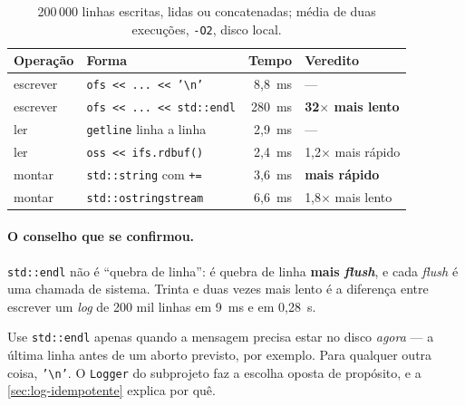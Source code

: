 \begin{table}[htbp]
\centering
\caption{200\,000 linhas escritas, lidas ou concatenadas; média de duas
         execuções, \texttt{-O2}, disco local.}
\label{tab:io-bench}
\footnotesize
\begin{tabular}{@{}llrl@{}}
\toprule
\textbf{Operação} & \textbf{Forma} & \textbf{Tempo} & \textbf{Veredito} \\
\midrule
escrever & \texttt{ofs << ... << '\textbackslash n'} &   8,8~ms & --- \\
escrever & \texttt{ofs << ... << std::endl}          & 280~ms   & \textbf{32$\times$ mais lento} \\
\midrule
ler      & \texttt{getline} linha a linha            &   2,9~ms & --- \\
ler      & \texttt{oss << ifs.rdbuf()}               &   2,4~ms & 1,2$\times$ mais rápido \\
\midrule
montar   & \texttt{std::string} com \texttt{+=}      &   3,6~ms & \textbf{mais rápido} \\
montar   & \texttt{std::ostringstream}               &   6,6~ms & 1,8$\times$ mais lento \\
\bottomrule
\end{tabular}
\end{table}

\paragraph{O conselho que se confirmou.} \texttt{std::endl} não é ``quebra de
linha'': é quebra de linha \textbf{mais \emph{flush}}, e cada \emph{flush} é
uma chamada de sistema. Trinta e duas vezes mais lento é a diferença entre
escrever um \emph{log} de 200 mil linhas em 9~ms e em 0,28~s.

\begin{regra}
Use \texttt{std::endl} apenas quando a mensagem precisa estar no disco
\emph{agora} --- a última linha antes de um aborto previsto, por exemplo. Para
qualquer outra coisa, \texttt{'\textbackslash n'}. O \texttt{Logger} do
subprojeto faz a escolha oposta de propósito, e a
\cref{sec:log-idempotente} explica por quê.
\end{regra}

